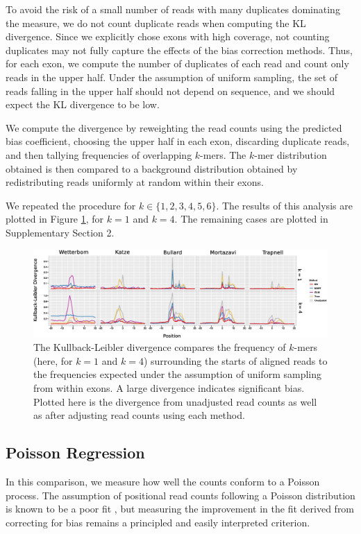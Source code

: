 \documentclass{bioinfo}
\begin{document}
To avoid the risk of a small number of reads with many duplicates dominating the
measure, we do not count duplicate reads when computing the KL divergence. Since we
explicitly chose exons with high coverage, not counting duplicates may not
fully capture the effects of the bias correction methods. Thus, for each exon,
we compute the number of duplicates of each read and count only reads in the
upper half. Under the assumption of uniform sampling, the set of reads falling
in the upper half should not depend on sequence, and we should expect the KL
divergence to be low.

We compute the divergence by reweighting the read counts using the predicted
bias coefficient, choosing the upper half in each exon, discarding duplicate
reads, and then tallying frequencies of overlapping $k$-mers. The $k$-mer
distribution obtained is then compared to a background distribution obtained by
redistributing reads uniformly at random within their exons.

We repeated the procedure for $k \in \{1, 2, 3, 4, 5, 6\}$. The results of this
analysis are plotted in Figure \ref{fig:kl}, for $k = 1$ and $k = 4$. The
remaining cases are plotted in Supplementary Section 2.

\begin{figure}
\centerline{\includegraphics[width=1.00\textwidth]{kl.eps}}
\caption{The Kullback-Leibler divergence compares the frequency of $k$-mers
(here, for $k = 1$ and $k = 4$) surrounding the starts of aligned reads to the
frequencies expected under the assumption of uniform sampling from within exons.
A large divergence indicates significant bias. Plotted here is the divergence
from unadjusted read counts as well as after adjusting read counts using each
method.}
\label{fig:kl}
\end{figure}


\subsection{Poisson Regression}

In this comparison, we measure how well the counts conform to a Poisson process.
The assumption of positional read counts following a Poisson distribution is
known to be a poor fit \citep{Srivastava2010}, but measuring the improvement in
the fit derived from correcting for bias remains a principled and easily
interpreted criterion.
\end{document}
